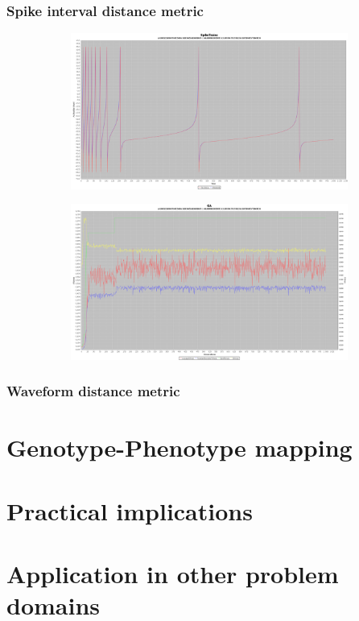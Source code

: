 \documentclass[12pt]{article}
\begin{document}
		\subsubsection{Spike interval distance metric}
			\begin{figure}[H]
				\centering
					\begin{subfigure}{.5\textwidth}
						\centering
						\includegraphics[width=\linewidth]{./../images/izzy4/interval/plot.png}
						
						\label{fig:sub11a}
					\end{subfigure}%
					\begin{subfigure}{.5\textwidth}
						\centering
						\includegraphics[width=\linewidth]{./../images/izzy4/interval/prog.png}
						
						\label{fig:sub11b}
					\end{subfigure}
					
					\label{fig:plot11}
			\end{figure}
		\subsubsection{Waveform distance metric}
	
\section{Genotype-Phenotype mapping}\label{sec:mapping}
\section{Practical implications}\label{sec:implications}
\section{Application in other problem domains}\label{sec:applications}
\end{document}
